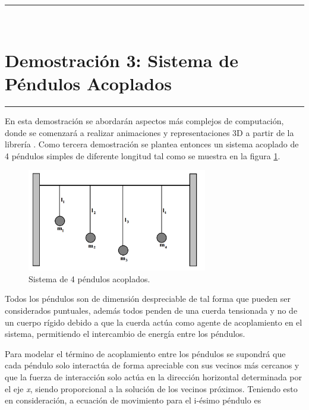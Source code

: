 \rule{14cm}{0.5mm}



\
\section{Demostración 3: Sistema de Péndulos Acoplados}
\label{sec:DEMO2_03}
\rule{14cm}{0.5mm}


En esta demostración se abordarán aspectos más complejos de computación,
donde se comenzará a realizar animaciones y representaciones 3D a partir
de la librería \mayavi. Como tercera demostración se plantea entonces un 
sistema acoplado de 4 péndulos simples de diferente longitud tal como se 
muestra en la figura \ref{fig:four_pendulums}.


\begin{figure}[htbp]
	\centering
	\includegraphics[width=0.70\textwidth]
	{./pictures/acopled_pendulum.png}

	\caption{\small{Sistema de 4 péndulos acoplados.}}
	
	\label{fig:four_pendulums}
\end{figure}


Todos los péndulos son de dimensión despreciable de tal forma que pueden 
ser considerados puntuales, además todos penden de una cuerda tensionada
y no de un cuerpo rígido debido a que la cuerda actúa como agente de 
acoplamiento en el sistema, permitiendo el intercambio de energía entre los
péndulos.


Para modelar el término de acoplamiento entre los péndulos se supondrá que
cada péndulo solo interactúa de forma apreciable con sus vecinos más 
cercanos y que la fuerza de interacción solo actúa en la dirección 
horizontal determinada por el eje \textit{x}, siendo proporcional a la 
solución de los vecinos próximos. Teniendo esto en consideración, a 
ecuación de movimiento para el i-ésimo péndulo es


